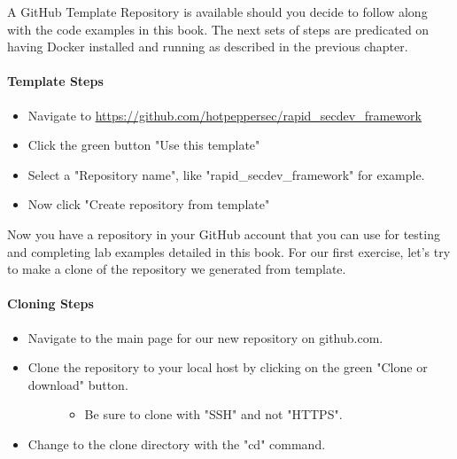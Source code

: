 \justify
A GitHub Template Repository is available should you decide to follow
along with the code examples in this book. The next sets of steps are
predicated on having Docker installed and running as described in the
previous chapter.


\paragraph{Template Steps}

\begin{itemize}

      \item
            Navigate to
            \url{https://github.com/hotpeppersec/rapid_secdev_framework}
      \item
            Click the green button "Use this template"
      \item
            Select a "Repository name", like "rapid\_secdev\_framework" for
            example.
      \item
            Now click "Create repository from template"
\end{itemize}

\justify
Now you have a repository in your GitHub account that you can use for
testing and completing lab examples detailed in this book. For our first
exercise, let's try to make a clone of the repository we generated from
template.


\paragraph{Cloning Steps}

\begin{itemize}
      \item
            Navigate to the main page for our new repository on github.com.
      \item
            \begin{description}
                  \item[Clone the repository to your local host by clicking on the green
                        "Clone or download" button.]
                        \begin{itemize}

                              \item
                                    Be sure to clone with "SSH" and not "HTTPS".
                        \end{itemize}
            \end{description}
      \item
            Change to the clone directory with the "cd" command.
\end{itemize}

